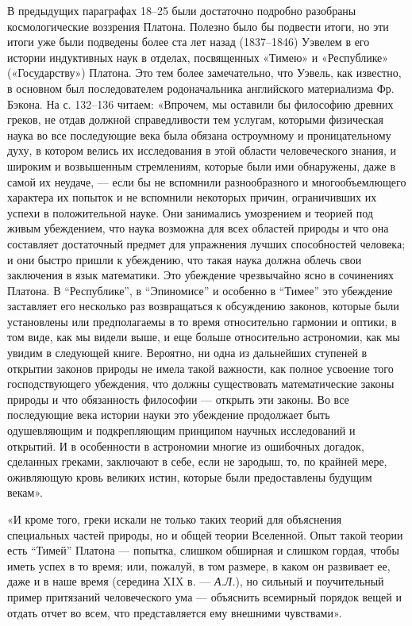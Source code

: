 В  предыдущих параграфах  18--25  были  достаточно подробно  разобраны
космологические воззрения Платона. Полезно  было бы подвести итоги, но
эти  итоги  уже  были  подведены  более  ста  лет  назад  (1837--1846)
Уэвелем  в  его  истории   индуктивных  наук  в  отделах,  посвященных
«Тимею»  и   «Республике»  («Государству»)  Платона.  Это   тем  более
замечательно, что Уэвель, как  известно, в основном был последователем
родоначальника  английского материализма  Фр. Бэкона.  На с.  132--136
читаем: «Впрочем,  мы оставили бы  философию древних греков,  не отдав
должной справедливости  тем услугам, которыми физическая  наука во все
последующие века  была обязана  остроумному и проницательному  духу, в
котором велись их исследования в  этой области человеческого знания, и
широким  и  возвышенным  стремлениям,  которые  были  ими  обнаружены,
даже  в самой  их неудаче,  ---  если бы  не вспомнили  разнообразного
и  многообъемлющего  характера их  попыток  и  не вспомнили  некоторых
причин, ограничивших  их успехи в положительной  науке. Они занимались
умозрением  и теорией  под живым  убеждением, что  наука возможна  для
всех областей  природы и  что она  составляет достаточный  предмет для
упражнения  лучших  способностей  человека;  и  они  быстро  пришли  к
убеждению,  что  такая наука  должна  облечь  свои заключения  в  язык
математики.  Это убеждение  чрезвычайно ясно  в сочинениях  Платона. В
``Республике'', в  ``Эпиномисе'' и особенно в  ``Тимее'' это убеждение
заставляет  его  несколько  раз  возвращаться  к  обсуждению  законов,
которые  были установлены  или предполагаемы  в то  время относительно
гармонии  и оптики,  в том  виде,  как мы  видели выше,  и еще  больше
относительно астрономии, как мы увидим в следующей книге. Вероятно, ни
одна из дальнейших ступеней в  открытии законов природы не имела такой
важности,  как полное  усвоение  того  господствующего убеждения,  что
должны существовать  математические законы  природы и  что обязанность
философии  --- открыть  эти законы.  Во все  последующие века  истории
науки  это  убеждение  продолжает быть  одушевляющим  и  подкрепляющим
принципом  научных   исследований  и  открытий.  И   в  особенности  в
астрономии многие из ошибочных догадок, сделанных греками, заключают в
себе, если не  зародыш, то, по крайней мере,  оживляющую кровь великих
истин, которые были предоставлены будущим векам».

«И  кроме того,  греки искали  не только  таких теорий  для объяснения
специальных частей  природы, но и  общей теории Вселенной.  Опыт такой
теории есть ``Тимей'' Платона ---  попытка, слишком обширная и слишком
гордая, чтобы  иметь успех в  то время;  или, пожалуй, в  том размере,
в  каком  он  развивает  ее,  даже   и  в  наше  время  (середина  XIX
в.  ---  \emph{А.Л.}), но  сильный  и  поучительный пример  притязаний
человеческого ума --- объяснить всемирный порядок вещей и отдать отчет
во всем, что представляется ему внешними чувствами».

